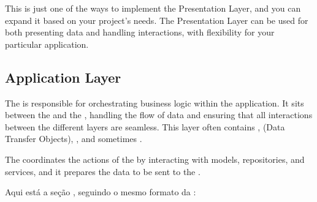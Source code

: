 \documentclass[letterpaper,10pt,english]{sphinxhowto}
\begin{document}
\sphinxAtStartPar
This is just one of the ways to implement the Presentation Layer, and you can expand it based on your project’s needs. The Presentation Layer can be used for both presenting data and handling interactions, with flexibility for your particular application.

\sphinxstepscope


\subsection{Application Layer}
\label{\detokenize{architecture/application/index:application-layer}}\label{\detokenize{architecture/application/index::doc}}
\sphinxAtStartPar
The  is responsible for orchestrating business logic within the application. It sits between the  and the , handling the flow of data and ensuring that all interactions between the different layers are seamless. This layer often contains ,  (Data Transfer Objects), , and sometimes .

\sphinxAtStartPar
The  coordinates the actions of the  by interacting with models, repositories, and services, and it prepares the data to be sent to the .

\sphinxAtStartPar
Aqui está a seção , seguindo o mesmo formato da :
\end{document}
